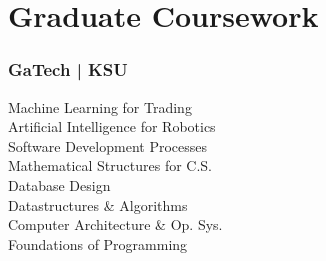 %
%
%
%
\section{Graduate Coursework}
  \subsubsection{GaTech | KSU}
      {\vspace{0.1em}}
      Machine Learning for Trading\\
      Artificial Intelligence for Robotics\\
      Software Development Processes\\
      Mathematical Structures for C.S.\\
      Database Design\\
      Datastructures \& Algorithms\\
      Computer Architecture \& Op. Sys.\\
      Foundations of Programming\\
%
%
%